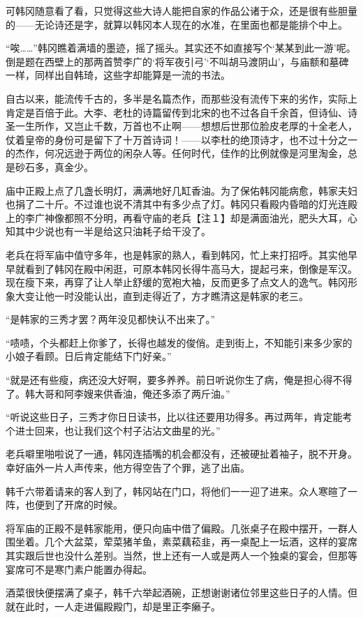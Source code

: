 可韩冈随意看了看，只觉得这些大诗人能把自家的作品公诸于众，还是很有些胆量的——无论诗还是字，就算以韩冈本人现在的水准，在里面也都是能排个中上。

“唉……”韩冈瞧着满墙的墨迹，摇了摇头。其实还不如直接写个‘某某到此一游’呢。倒是题在西壁上的那两首赞李广的‘将军夜引弓’‘不叫胡马渡阴山’，与庙额和墓碑一样，同样出自韩琦，这些字却能算是一流的书法。

自古以来，能流传千古的，多半是名篇杰作，而那些没有流传下来的劣作，实际上肯定是百倍于此。大李、老杜的诗篇留传到北宋的也不过各自千余首，但诗仙、诗圣一生所作，又岂止千数，万首也不止啊——想想后世那位脸皮老厚的十全老人，仗着皇帝的身份可是留下了十万首诗词！——以李杜的绝顶诗才，也不过十分之一的杰作，何况远逊于两位的闲杂人等。任何时代，佳作的比例就像是河里淘金，总是砂石多，真金少。

庙中正殿上点了几盏长明灯，满满地好几缸香油。为了保佑韩冈能病愈，韩家夫妇也捐了二十斤。不过谁也说不清其中有多少点了灯。韩冈只看殿内昏暗的灯光连殿上的李广神像都照不分明，再看守庙的老兵【注１】却是满面油光，肥头大耳，心知其中少说也有一半是给这只油耗子给干没了。

老兵在将军庙中值守多年，也是韩家的熟人，看到韩冈，忙上来打招呼。其实他早早就看到了韩冈在殿中闲逛，可原本韩冈长得牛高马大，提起弓来，倒像是军汉。现在瘦下来，再穿了让人举止舒缓的宽袍大袖，反而更多了点文人的逸气。韩冈形象大变让他一时没能认出，直到走得近了，方才瞧清这是韩家的老三。

“是韩家的三秀才罢？两年没见都快认不出来了。”

“啧啧，个头都赶上你爹了，长得也越发的俊俏。走到街上，不知能引来多少家的小娘子看顾。日后肯定能结下门好亲。”

“就是还有些瘦，病还没大好啊，要多养养。前日听说你生了病，俺是担心得不得了。韩大哥和阿李嫂来供香油，俺还多添了两斤油。”

“听说这些日子，三秀才你日日读书，比以往还要用功得多。再过两年，肯定能考个进士回来，也让我们这个村子沾沾文曲星的光。”

老兵噼里啪啦说了一通，韩冈连插嘴的机会都没有，还被硬扯着袖子，脱不开身。幸好庙外一片人声传来，他方得空告了个罪，逃了出庙。

韩千六带着请来的客人到了，韩冈站在门口，将他们一一迎了进来。众人寒暄了一阵，也便到了开席的时候。

将军庙的正殿不是韩家能用，便只向庙中借了偏殿。几张桌子在殿中摆开，一群人围坐着。几个大盆菜，荤菜猪羊鱼，素菜藕菘韭，再一桌配上一坛酒，这样的宴席其实跟后世也没什么差别。当然，世上还有一人或是两人一个独桌的宴会，但那等宴席可不是寒门素户能置办得起。

酒菜很快便摆满了桌子，韩千六举起酒碗，正想谢谢诸位邻里这些日子的人情。但就在此时，一人走进偏殿殿门，却是里正李癞子。

